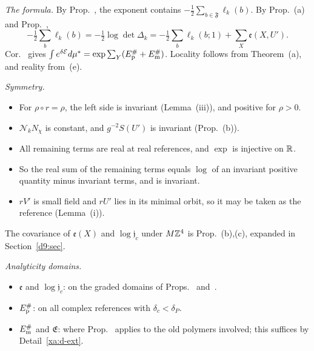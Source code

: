 \begin{detail}\label{xa:d-sfthm}
\emph{The formula.} By Prop.~, the exponent contains $-\frac12\sum_{b\in\mathfrak F}\ell_k(b)$. By Prop.~(a) and Prop.~,
\[
-\tfrac12\sum_b\ell_k(b)=-\tfrac12\log\det\Delta_k=-\tfrac12\sum_b\ell_k(b;1)+\sum_X\mathfrak e(X,U').
\]
Cor.~ gives $\int e^{\delta\mathcal E}d\mu^*=\exp\sum_Y(E^\#_{\rm p}+E^\#_{\rm m})$. Locality follows from Theorem~(a), and reality from~(e).

\emph{Symmetry.}
\begin{itemize}
\item For $\rho\circ r=\rho$, the left side is invariant (Lemma~(iii)), and positive for $\rho>0$.
\item $\mathcal N_kN_\chi$ is constant, and $g^{-2}S(U')$ is invariant (Prop.~(b)).
\item All remaining terms are real at real references, and $\exp$ is injective on $\mathbb R$.
\item So the real sum of the remaining terms equals $\log$ of an invariant positive quantity minus invariant terms, and is invariant.
\item $rV'$ is small field and $rU'$ lies in its minimal orbit, so it may be taken as the reference (Lemma~(i)).
\end{itemize}
The covariance of $\mathfrak e(X)$ and $\log\mathfrak j_c$ under $M\mathbb Z^4$ is Prop.~(b),(c), expanded in Section~\ref{d9:sec}.

\emph{Analyticity domains.}
\begin{itemize}
\item $\mathfrak e$ and $\log\mathfrak j_c$: on the graded domains of Props.~ and~.
\item $E^\#_{\rm p}$: on all complex references with $\delta_c<\delta_P$.
\item $E^\#_{\rm m}$ and $\mathfrak E$: where Prop.~ applies to the old polymers involved; this suffices by Detail~\ref{xa:d-ext}.
\end{itemize}
\end{detail}


